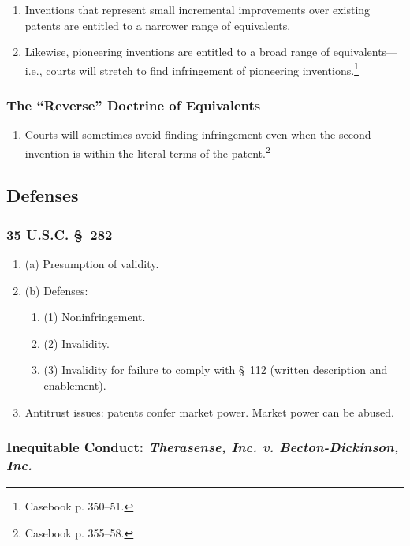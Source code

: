 \begin{enumerate}
    \item Inventions that represent small incremental improvements over 
    existing patents are entitled to a narrower range of equivalents.
    \item Likewise, pioneering inventions are entitled to a broad range of 
    equivalents---i.e., courts will stretch to find infringement of pioneering 
    inventions.\footnote{Casebook p. 350--51.}
\end{enumerate}

\subsubsection{The ``Reverse'' Doctrine of Equivalents}

\begin{enumerate}
    \item Courts will sometimes avoid finding infringement even when the 
    second invention is within the literal terms of the 
    patent.\footnote{Casebook p. 355--58.}
\end{enumerate}

\subsection{Defenses}

\subsubsection{35 U.S.C. \S\ 282}

\begin{enumerate}
    \item (a) Presumption of validity.
    \item (b) Defenses:
    \begin{enumerate}
        \item (1) Noninfringement.
        \item (2) Invalidity.
        \item (3) Invalidity for failure to comply with \S\ 112 (written 
        description and enablement).
    \end{enumerate}
    \item Antitrust issues: patents confer market power. Market power can be 
    abused.
\end{enumerate}

\subsubsection{Inequitable Conduct: \emph{Therasense, Inc. v. Becton-Dickinson, 
Inc.}}

